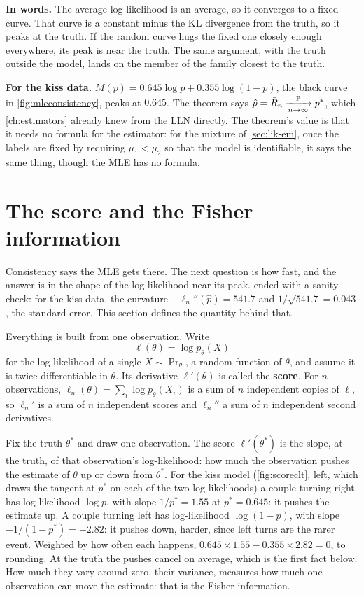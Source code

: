 \begin{inwords}
\textbf{In words.} The average log-likelihood is an average, so it converges to a fixed curve. That curve is a constant minus the KL divergence from the truth, so it peaks at the truth. If the random curve hugs the fixed one closely enough everywhere, its peak is near the truth. The same argument, with the truth outside the model, lands on the member of the family closest to the truth.
\par\smallskip
\textbf{For the kiss data.} $M(p) = 0.645\log p + 0.355\log(1 - p)$, the black curve in \cref{fig:mleconsistency}, peaks at $0.645$. The theorem says $\hat{p} = \bar{R}_n \xrightarrow [n \to \infty ]{\mathbb{P}} p^*$, which \cref{ch:estimators} already knew from the LLN directly. The theorem's value is that it needs no formula for the estimator: for the mixture of \cref{sec:lik-em}, once the labels are fixed by requiring $\mu_1 < \mu_2$ so that the model is identifiable, it says the same thing, though the MLE has no formula.
\end{inwords}

\section{The score and the Fisher information}
\label{sec:mle-fisher}

Consistency says the MLE gets there.
The next question is how fast, and the answer is in the shape of the log-likelihood near its peak.
 ended with a sanity check: for the kiss data, the curvature $-\ell_n''(\hat{p}) = 541.7$ and $1/\sqrt{541.7} = 0.043$, the standard error.
This section defines the quantity behind that.

Everything is built from one observation.
Write
\[
\ell(\theta) = \log p_\theta(X)
\]
for the log-likelihood of a single $X \sim \Pr_{\theta}$, a random function of $\theta$, and assume it is twice differentiable in $\theta$.
Its derivative $\ell'(\theta)$ is called the \textbf{score}.
For $n$ observations, $\ell_n(\theta) = \sum_i \log p_\theta(X_i)$ is a sum of $n$ independent copies of $\ell$, so $\ell_n'$ is a sum of $n$ independent scores and $\ell_n''$ a sum of $n$ independent second derivatives.

\begin{intuition}
Fix the truth $\theta^*$ and draw one observation.
The score $\ell'(\theta^*)$ is the slope, at the truth, of that observation's log-likelihood: how much the observation pushes the estimate of $\theta$ up or down from $\theta^*$.
For the kiss model (\cref{fig:scoreclt}, left, which draws the tangent at $p^*$ on each of the two log-likelihoods) a couple turning right has log-likelihood $\log p$, with slope $1/p^* = 1.55$ at $p^* = 0.645$: it pushes the estimate up.
A couple turning left has log-likelihood $\log(1 - p)$, with slope $-1/(1 - p^*) = -2.82$: it pushes down, harder, since left turns are the rarer event.
Weighted by how often each happens, $0.645 \times 1.55 - 0.355 \times 2.82 = 0$, to rounding.
At the truth the pushes cancel on average, which is the first fact below.
How much they vary around zero, their variance, measures how much one observation can move the estimate: that is the Fisher information.
\end{intuition}

